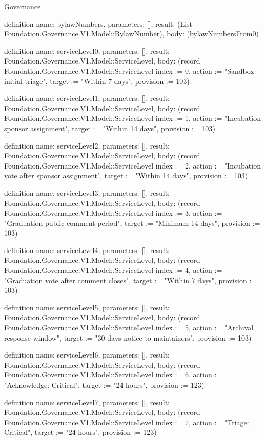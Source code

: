 \begin{lexlean}{Governance}
\begin{semanticmodule}
definition{
  name: bylawNumbers,
  parameters: [],
  result: (List Foundation.Governance.V1.Model::BylawNumber),
  body: (bylawNumbersFrom0)
}

definition{
  name: serviceLevel0,
  parameters: [],
  result: Foundation.Governance.V1.Model::ServiceLevel,
  body: (record Foundation.Governance.V1.Model::ServiceLevel {index := 0, action := "Sandbox initial triage", target := "Within 7 days", provision := 103})
}

definition{
  name: serviceLevel1,
  parameters: [],
  result: Foundation.Governance.V1.Model::ServiceLevel,
  body: (record Foundation.Governance.V1.Model::ServiceLevel {index := 1, action := "Incubation sponsor assignment", target := "Within 14 days", provision := 103})
}

definition{
  name: serviceLevel2,
  parameters: [],
  result: Foundation.Governance.V1.Model::ServiceLevel,
  body: (record Foundation.Governance.V1.Model::ServiceLevel {index := 2, action := "Incubation vote after sponsor assignment", target := "Within 14 days", provision := 103})
}

definition{
  name: serviceLevel3,
  parameters: [],
  result: Foundation.Governance.V1.Model::ServiceLevel,
  body: (record Foundation.Governance.V1.Model::ServiceLevel {index := 3, action := "Graduation public comment period", target := "Minimum 14 days", provision := 103})
}

definition{
  name: serviceLevel4,
  parameters: [],
  result: Foundation.Governance.V1.Model::ServiceLevel,
  body: (record Foundation.Governance.V1.Model::ServiceLevel {index := 4, action := "Graduation vote after comment closes", target := "Within 7 days", provision := 103})
}

definition{
  name: serviceLevel5,
  parameters: [],
  result: Foundation.Governance.V1.Model::ServiceLevel,
  body: (record Foundation.Governance.V1.Model::ServiceLevel {index := 5, action := "Archival response window", target := "30 days notice to maintainers", provision := 103})
}

definition{
  name: serviceLevel6,
  parameters: [],
  result: Foundation.Governance.V1.Model::ServiceLevel,
  body: (record Foundation.Governance.V1.Model::ServiceLevel {index := 6, action := "Acknowledge: Critical", target := "24 hours", provision := 123})
}

definition{
  name: serviceLevel7,
  parameters: [],
  result: Foundation.Governance.V1.Model::ServiceLevel,
  body: (record Foundation.Governance.V1.Model::ServiceLevel {index := 7, action := "Triage: Critical", target := "24 hours", provision := 123})
}


\end{semanticmodule}
\end{lexlean}
